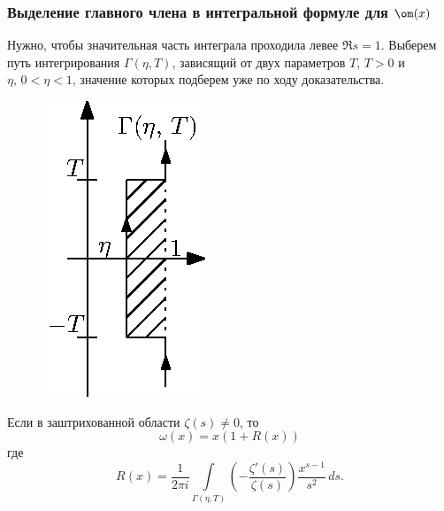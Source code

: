 \subsubsection{Выделение главного члена в интегральной формуле для $\om(x)$}

Нужно, чтобы значительная часть интеграла проходила левее $\Re s=1$. Выберем путь интегрирования $\Gamma(\eta, T)$, зависящий от двух параметров $T,\,T>0$ и $\eta,\,0<\eta<1$, значение которых подберем уже по ходу доказательства.\par
\begin{figure}
\begin{center}
\vskip -20pt
\includegraphics[scale=1.0, trim=20 0 0 0]{pics/05021}
\end{center}
\end{figure}
\begin{stm} Если в заштрихованной области $\zeta(s) \not = 0$, то
$$\omega(x) = x(1 + R(x))$$ где $$R(x) = \frac{1}{2\pi i} \int\limits_{\Gamma(\eta, T)} \left(-\frac{\zeta '(s)}{\zeta (s)}\right)\frac{x^{s-1}}{s^2}\,ds.$$
\end{stm}

